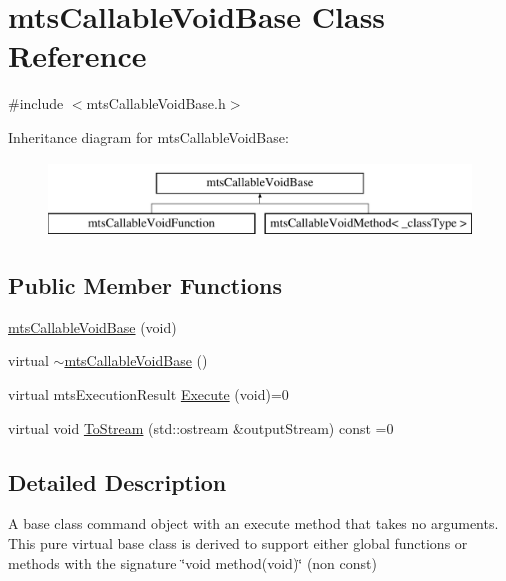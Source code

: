\hypertarget{classmts_callable_void_base}{}\section{mts\+Callable\+Void\+Base Class Reference}
\label{classmts_callable_void_base}


{\ttfamily \#include $<$mts\+Callable\+Void\+Base.\+h$>$}

Inheritance diagram for mts\+Callable\+Void\+Base\+:\begin{figure}[H]
\begin{center}
\leavevmode
\includegraphics[height=2.000000cm]{d5/dec/classmts_callable_void_base}
\end{center}
\end{figure}
\subsection*{Public Member Functions}
\begin{DoxyCompactItemize}
\item 
\hyperlink{classmts_callable_void_base_a442904860e8544aa4fccd3b9d05fef46}{mts\+Callable\+Void\+Base} (void)
\item 
virtual \hyperlink{classmts_callable_void_base_ae730a7775e63ed730fa0f3fe15202e9c}{$\sim$mts\+Callable\+Void\+Base} ()
\item 
virtual mts\+Execution\+Result \hyperlink{classmts_callable_void_base_a4db041f05ff4a394b88ef53f76ffa86c}{Execute} (void)=0
\item 
virtual void \hyperlink{classmts_callable_void_base_aca49f7ddbc0b2a1d79a78558dc1114b2}{To\+Stream} (std\+::ostream \&output\+Stream) const =0
\end{DoxyCompactItemize}


\subsection{Detailed Description}
A base class command object with an execute method that takes no arguments. This pure virtual base class is derived to support either global functions or methods with the signature \char`\"{}void
method(void)\char`\"{} (non const) 

